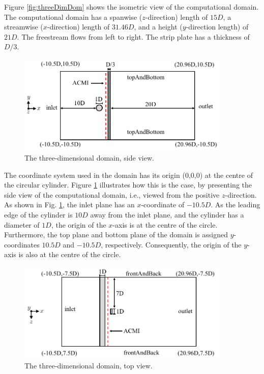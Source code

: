 \documentclass[oneside]{utmthesis}
\begin{document}
Figure \ref{fig:threeDimDom} shows the isometric view of the computational domain. The computational domain has a spanwise ($z$-direction) length of $15D$, a streamwise ($x$-direction) length of $31.46D$, and a height ($y$-direction length) of $21D$. The freestream flows from left to right. The strip plate has a thickness of $D/3$.

\begin{figure}[!h]
  \centering
  \hspace{1cm} \includegraphics[width=0.9\textwidth]{figs/problemGeometrySide}
  \caption{The three-dimensional domain, side view.}
  \label{fig:probGeoSide}
\end{figure}

The coordinate system used in the domain has its origin (0,0,0) at the centre of the circular cylinder. Figure \ref{fig:probGeoSide} illustrates how this is the case, by presenting the side view of the computational domain, i.e., viewed from the positive $z$-direction. As shown in Fig. \ref{fig:probGeoSide}, the inlet plane has an $x$-coordinate of $-10.5D$. As the leading edge of the cylinder is $10D$ away from the inlet plane, and the cylinder has a diameter of $1D$, the origin of the $x$-axis is at the centre of the circle. Furthermore, the top plane and bottom plane of the domain is assigned $y$-coordinates $10.5D$ and $-10.5D$, respectively. Consequently, the origin of the $y$-axis is also at the centre of the circle.

\begin{figure}[!h]
  \centering
  \hspace{1cm} \includegraphics[width=0.9\textwidth]{figs/problemGeometryTop}
  \caption{The three-dimensional domain, top view.}
  \label{fig:probGeoTop}
\end{figure}
\end{document}
